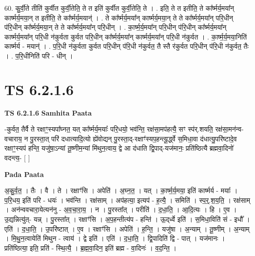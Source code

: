 \documentclass[17pt]{extarticle}
\begin{document}
60. कु॒र्वी॒ते तीति॑ कुर्वीत कुर्वी॒तेति॒ ते त इति॑ कुर्वीत कुर्वी॒तेति॒ ते । . इति॒ ते त इतीति॒ ते का᳚र्ष्मर्य॒मया᳚न् कार्ष्मर्य॒मया॒न् त इतीति॒ ते का᳚र्ष्मर्य॒मयान्॑ । . ते का᳚र्ष्मर्य॒मया᳚न् कार्ष्मर्य॒मया॒न् ते ते का᳚र्ष्मर्य॒मया᳚न् परि॒धीन् प॑रि॒धीन् का᳚र्ष्मर्य॒मया॒न् ते ते का᳚र्ष्मर्य॒मया᳚न् परि॒धीन् । . का॒र्ष्म॒र्य॒मया᳚न् परि॒धीन् प॑रि॒धीन् का᳚र्ष्मर्य॒मया᳚न् कार्ष्मर्य॒मया᳚न् परि॒धी न॑कुर्वता कुर्वत परि॒धीन् का᳚र्ष्मर्य॒मया᳚न् कार्ष्मर्य॒मया᳚न् परि॒धी न॑कुर्वत । . का॒र्ष्म॒र्य॒मया॒निति॑ कार्ष्मर्य - मयान्॑ । . प॒रि॒धी न॑कुर्वता कुर्वत परि॒धीन् प॑रि॒धी न॑कुर्वत॒ तै स्तै र॑कुर्वत परि॒धीन् प॑रि॒धी न॑कुर्वत॒ तैः । . प॒रि॒धीनिति॑ परि - धीन् । \newline
\pagebreak
{}

\section{ TS 6.2.1.6 }

\textbf{TS 6.2.1.6 } \newline
\textbf{Samhita Paata} \newline

-कुर्वत॒ तैर्वै ते रक्षाꣳ॒॒स्यपा᳚घ्नत॒ यत् का᳚र्ष्मर्य॒मयाः᳚ परि॒धयो॒ भव॑न्ति॒ रक्ष॑सा॒मप॑हत्यै॒ सꣳ स्प॑र्.शयति॒ रक्ष॑सा॒मन॑न्व-वचाराय॒ न पु॒रस्ता॒त् परि॑ दधात्यादि॒त्यो ह्ये॑वोद्यन् पु॒रस्ता॒द्-रक्षाꣳ॑स्यप॒हन्त्यू॒र्द्ध्वे स॒मिधा॒वा द॑धात्यु॒परि॑ष्टादे॒व रक्षाꣳ॒॒स्यप॑ हन्ति॒ यजु॑षा॒ऽन्यां तू॒ष्णीम॒न्यां मि॑थुन॒त्वाय॒ द्वे आ द॑धाति द्वि॒पाद्-यज॑मानः॒ प्रति॑ष्ठित्यै ब्रह्मवा॒दिनो॑ वदन्त्य॒- [  ] \newline

\textbf{Pada Paata} \newline

अ॒कु॒र्व॒त॒ । तैः । वै । ते । रक्षाꣳ॑सि । अपेति॑ । अ॒घ्न॒त॒ । यत् । का॒र्ष्म॒र्य॒मया॒ इति॑ कार्ष्मर्य - मयाः᳚ । प॒रि॒धय॒ इति॑ परि - धयः॑ । भव॑न्ति । रक्ष॑साम् । अप॑हत्या॒ इत्यप॑ - ह॒त्यै॒ । समिति॑ । स्प॒र्॒.श॒य॒ति॒ । रक्ष॑साम् । अन॑न्ववचारा॒येत्यन॑नु - अ॒व॒चा॒रा॒य॒ । न । पु॒रस्ता᳚त् । परीति॑ । द॒धा॒ति॒ । आ॒दि॒त्यः । हि । ए॒व । उ॒द्यन्नित्यु॑त्- यन्न् । पु॒रस्ता᳚त् । रक्षाꣳ॑सि । अ॒प॒हन्तीत्य॑प - हन्ति॑ । ऊ॒द्‌र्ध्वे इति॑ । स॒मिधा॒विति॑ सं - इधौ᳚ । एति॑ । द॒धा॒ति॒ । उ॒परि॑ष्टात् । ए॒व । रक्षाꣳ॑सि । अपेति॑ । ह॒न्ति॒ । यजु॑षा । अ॒न्याम् । तू॒ष्णीम् । अ॒न्याम् । मि॒थु॒न॒त्वायेति॑ मिथुन - त्वाय॑ । द्वे इति॑ । एति॑ । द॒धा॒ति॒ । द्वि॒पादिति॑ द्वि - पात् । यज॑मानः । प्रति॑ष्ठित्या॒ इति॒ प्रति॑ - स्थि॒त्यै॒ । ब्र॒ह्म॒वा॒दिन॒ इति॑ ब्रह्म - वा॒दिनः॑ । व॒द॒न्ति॒ ।  \newline
\end{document}
